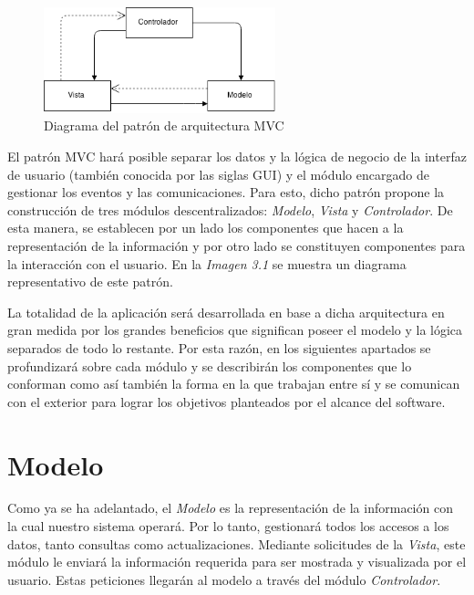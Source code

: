 \documentclass{book}
\begin{document}
\begin{figure}[H]
	\centering
	\includegraphics[width=0.6\textwidth]{images/01-MVC.png}
	\medskip
	\caption{Diagrama del patrón de arquitectura MVC}
	\medskip
\end{figure}
	\bigskip
	
	El patrón MVC hará posible separar los datos y la lógica de negocio de la interfaz de usuario (también conocida por las siglas GUI) y el módulo encargado de gestionar los eventos y las comunicaciones. Para esto, dicho patrón propone la construcción de tres módulos descentralizados: \textit{Modelo}, \textit{Vista} y \textit{Controlador}. De esta manera, se establecen por un lado los componentes que hacen a la representación de la información y por otro lado se constituyen componentes para la interacción con el usuario. En la \textit{Imagen 3.1} se muestra un diagrama representativo de este patrón.
	\par
	La totalidad de la aplicación será desarrollada en base a dicha arquitectura en gran medida por los grandes beneficios que significan poseer el modelo y la lógica separados de todo lo restante. Por esta razón, en los siguientes apartados se profundizará sobre cada módulo y se describirán los componentes que lo conforman como así también la forma en la que trabajan entre sí y se comunican con el exterior para lograr los objetivos planteados por el alcance del software.
	\newpage


\section{Modelo}

	Como ya se ha adelantado, el \textit{Modelo} es la representación de la información con la cual nuestro sistema operará. Por lo tanto, gestionará todos los accesos a los datos, tanto consultas como actualizaciones. Mediante solicitudes de la \textit{Vista}, este módulo le enviará la información requerida para ser mostrada y visualizada por el usuario. Estas peticiones llegarán al modelo a través del módulo \textit{Controlador}.
	\bigskip
\end{document}

